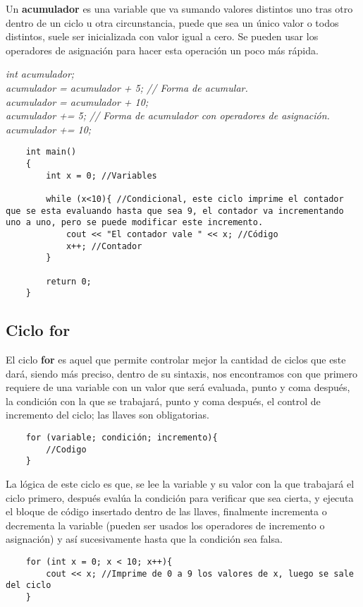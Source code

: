 Un \textbf{acumulador} es una variable que va sumando valores distintos uno tras otro dentro de un ciclo u otra circunstancia, puede que sea un único valor o todos distintos, suele ser inicializada con valor igual a cero. Se pueden usar los operadores de asignación para hacer esta operación un poco más rápida.
\begin{center}
    \textit{
        int acumulador; \\
        acumulador = acumulador + 5; // Forma de acumular. \\
        acumulador = acumulador + 10; \\
        acumulador += 5; // Forma de acumulador con operadores de asignación. \\
        acumulador += 10;
    }
\end{center}
\begin{lstlisting}
    int main()
    {
        int x = 0; //Variables
        
        while (x<10){ //Condicional, este ciclo imprime el contador que se esta evaluando hasta que sea 9, el contador va incrementando uno a uno, pero se puede modificar este incremento.
            cout << "El contador vale " << x; //Código
            x++; //Contador
        }
        
        return 0;
    }
\end{lstlisting}


\subsection{Ciclo for}
\hspace{0.55cm}El ciclo \textbf{for} es aquel que permite controlar mejor la cantidad de ciclos que este dará, siendo más preciso, dentro de su sintaxis, nos encontramos con que primero requiere de una variable con un valor que será evaluada, punto y coma después, la condición con la que se trabajará, punto y coma después, el control de incremento del ciclo; las llaves son obligatorias.
\begin{lstlisting}
    for (variable; condición; incremento){
        //Codigo
    }
\end{lstlisting}

La lógica de este ciclo es que, se lee la variable y su valor con la que trabajará el ciclo primero, después evalúa la condición para verificar que sea cierta, y ejecuta el bloque de código insertado dentro de las llaves, finalmente incrementa o decrementa la variable (pueden ser usados los operadores de incremento o asignación) y así sucesivamente hasta que la condición sea falsa.
\begin{lstlisting}
    for (int x = 0; x < 10; x++){
        cout << x; //Imprime de 0 a 9 los valores de x, luego se sale del ciclo
    }
\end{lstlisting}


